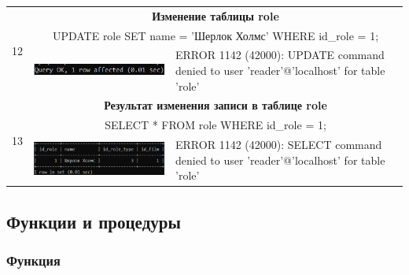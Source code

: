 \documentclass[11pt,a4paper,final]{article} %
\begin{document}
\begin{table}[H]
\begin{tabularx}{\textwidth}{|c|X|X|}
				
		\multirow{3}{*}{12} & \multicolumn{2}{c|}{\textbf{Изменение таблицы role}}\\
		& \multicolumn{2}{c|}{UPDATE role SET name = 'Шерлок Холмс' WHERE id\_role = 1;}\\
		\cline{2-3}
		& 
		\vspace{-6pt}
		\hspace{-8.5pt}
		\includegraphics[width=1\linewidth]{e6.png}
		& 
		\vspace{-6pt}
		\hspace{-8.5pt}
		ERROR 1142 (42000): UPDATE command denied to user 'reader'@'localhost' for table 'role'
		\\
		\cline{1-3}
		
		\multirow{3}{*}{13} & \multicolumn{2}{c|}{\textbf{Результат изменения записи в таблице role}}\\
		& \multicolumn{2}{c|}{SELECT * FROM role WHERE id\_role = 1;}\\
		\cline{2-3}
		& 
		\vspace{-6pt}
		\hspace{-8.5pt}
		\includegraphics[width=1\linewidth]{n6.png}
		& 
		\vspace{-6pt}
		\hspace{-8.5pt}
		ERROR 1142 (42000): SELECT command denied to user 'reader'@'localhost' for table 'role'
		\\
		\cline{1-3}
		
		
	\end{tabularx}
\end{table}


\newpage
\subsection{Функции и процедуры}

\subsubsection{Функция}
\end{document}
